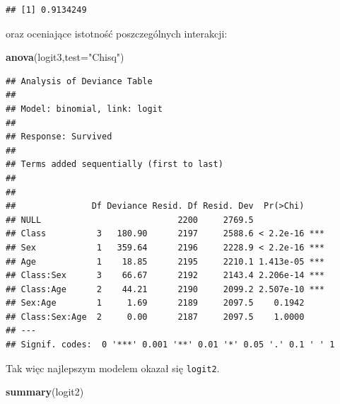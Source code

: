 \documentclass[polish,]{book}
\newenvironment{Shaded}{\begin{snugshade}}{\end{snugshade}}
\newcommand{\DataTypeTok}[1]{\textcolor[rgb]{0.13,0.29,0.53}{#1}}
\newcommand{\KeywordTok}[1]{\textcolor[rgb]{0.13,0.29,0.53}{\textbf{#1}}}
\newcommand{\NormalTok}[1]{#1}
\newcommand{\StringTok}[1]{\textcolor[rgb]{0.31,0.60,0.02}{#1}}
\begin{document}
\begin{verbatim}
## [1] 0.9134249
\end{verbatim}

oraz oceniające istotność poszczególnych interakcji:

\begin{Shaded}
\begin{Highlighting}[]
\KeywordTok{anova}\NormalTok{(logit3,}\DataTypeTok{test=}\StringTok{"Chisq"}\NormalTok{)}
\end{Highlighting}
\end{Shaded}

\begin{verbatim}
## Analysis of Deviance Table
## 
## Model: binomial, link: logit
## 
## Response: Survived
## 
## Terms added sequentially (first to last)
## 
## 
##               Df Deviance Resid. Df Resid. Dev  Pr(>Chi)    
## NULL                           2200     2769.5              
## Class          3   180.90      2197     2588.6 < 2.2e-16 ***
## Sex            1   359.64      2196     2228.9 < 2.2e-16 ***
## Age            1    18.85      2195     2210.1 1.413e-05 ***
## Class:Sex      3    66.67      2192     2143.4 2.206e-14 ***
## Class:Age      2    44.21      2190     2099.2 2.507e-10 ***
## Sex:Age        1     1.69      2189     2097.5    0.1942    
## Class:Sex:Age  2     0.00      2187     2097.5    1.0000    
## ---
## Signif. codes:  0 '***' 0.001 '**' 0.01 '*' 0.05 '.' 0.1 ' ' 1
\end{verbatim}

Tak więc najlepszym modelem okazał się \texttt{logit2}.

\begin{Shaded}
\begin{Highlighting}[]
\KeywordTok{summary}\NormalTok{(logit2)}
\end{Highlighting}
\end{Shaded}
\end{document}
